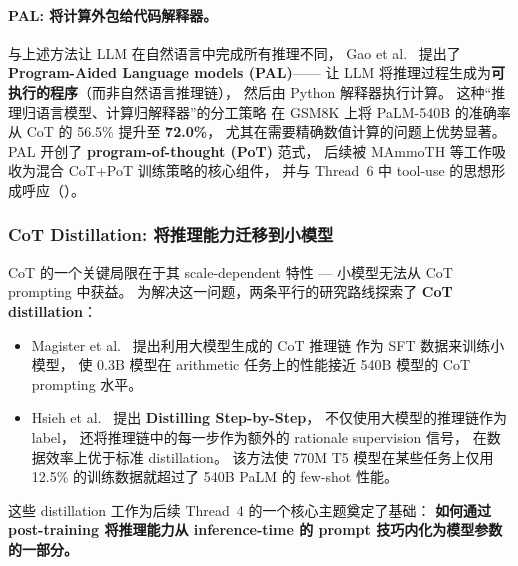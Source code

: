 
\paragraph{PAL: 将计算外包给代码解释器。}
与上述方法让 LLM 在自然语言中完成所有推理不同，
Gao et al.\ \cite{gao2022pal} 提出了 \textbf{Program-Aided Language models (PAL)}——
让 LLM 将推理过程生成为\textbf{可执行的程序}（而非自然语言推理链），
然后由 Python 解释器执行计算。
这种``推理归语言模型、计算归解释器''的分工策略
在 GSM8K 上将 PaLM-540B 的准确率从 CoT 的 56.5\% 提升至 \textbf{72.0\%}，
尤其在需要精确数值计算的问题上优势显著。
PAL 开创了 \textbf{program-of-thought (PoT)} 范式，
后续被 MAmmoTH \cite{yue2023mammoth} 等工作吸收为混合 CoT+PoT 训练策略的核心组件，
并与 Thread~6 中 tool-use 的思想形成呼应（）。

\subsubsection{CoT Distillation: 将推理能力迁移到小模型}

CoT 的一个关键局限在于其 scale-dependent 特性 ---
小模型无法从 CoT prompting 中获益。
为解决这一问题，两条平行的研究路线探索了 \textbf{CoT distillation}：

\begin{itemize}[leftmargin=2em]
  \item Magister et al.\ \cite{magister2023cotdistill} 提出利用大模型生成的 CoT 推理链
    作为 SFT 数据来训练小模型，
    使 0.3B 模型在 arithmetic 任务上的性能接近 540B 模型的 CoT prompting 水平。

  \item Hsieh et al.\ \cite{hsieh2023distillstep} 提出 \textbf{Distilling Step-by-Step}，
    不仅使用大模型的推理链作为 label，
    还将推理链中的每一步作为额外的 rationale supervision 信号，
    在数据效率上优于标准 distillation。
    该方法使 770M T5 模型在某些任务上仅用 12.5\% 的训练数据就超过了 540B PaLM 的 few-shot 性能。
\end{itemize}

\noindent
这些 distillation 工作为后续 Thread~4 的一个核心主题奠定了基础：
\textbf{如何通过 post-training 将推理能力从 inference-time 的 prompt 技巧内化为模型参数的一部分。}


